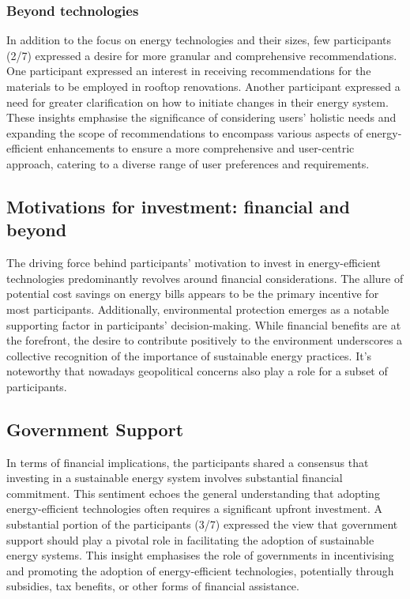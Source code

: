 \subsubsection{Beyond technologies}

In addition to the focus on energy technologies and their sizes, few participants (2/7) expressed a desire for more granular and comprehensive recommendations. 
One participant expressed an interest in receiving recommendations for the materials to be employed in rooftop renovations. 
Another participant expressed a need for greater clarification on how to initiate changes in their energy system. 
These insights emphasise the significance of considering users' holistic needs and expanding the scope of recommendations to encompass various aspects of energy-efficient enhancements to ensure a more comprehensive and user-centric approach, catering to a diverse range of user preferences and requirements.


\subsection{Motivations for investment: financial and beyond}

The driving force behind participants' motivation to invest in energy-efficient technologies predominantly revolves around financial considerations. 
The allure of potential cost savings on energy bills appears to be the primary incentive for most participants. 
Additionally, environmental protection emerges as a notable supporting factor in participants' decision-making. 
While financial benefits are at the forefront, the desire to contribute positively to the environment underscores a collective recognition of the importance of sustainable energy practices.
It's noteworthy that nowadays geopolitical concerns also play a role for a subset of participants. 


\subsection{Government Support}

In terms of financial implications, the participants shared a consensus that investing in a sustainable energy system involves substantial financial commitment. 
This sentiment echoes the general understanding that adopting energy-efficient technologies often requires a significant upfront investment.
A substantial portion of the participants (3/7) expressed the view that government support should play a pivotal role in facilitating the adoption of sustainable energy systems.
This insight emphasises the role of governments in incentivising and promoting the adoption of energy-efficient technologies, potentially through subsidies, tax benefits, or other forms of financial assistance. 



